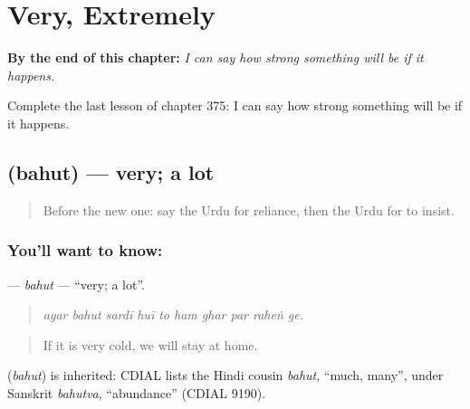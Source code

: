 
\chapter{Very, Extremely}
\label{ch:ur-very-extremely}

\begin{chapteropening}
\textbf{By the end of this chapter:} \emph{I can say how strong something will be if it happens.}

Complete the last lesson of chapter 375: I can say how strong something will be if it happens.
\end{chapteropening}

\section[\texorpdfstring{\ur{بہت} (bahut)}{بہت (bahut)}]{ (bahut) — very; a lot}

\label{lesson:UR-C375-bahut}



\begin{quote}
Before the new one: say the Urdu for reliance, then the Urdu for to insist.
\end{quote}

\subsection*{You'll want to know: }
\textbf{} — \emph{bahut} — \textquotedblleft{}very; a lot\textquotedblright{}.

\begin{quote}
         
\end{quote}

\begin{quote}
\emph{agar bahut sardī huī to ham ghar par raheṅ ge.}
\end{quote}

\begin{quote}
If it is very cold, we will stay at home.
\end{quote}

\begin{cousinweb}
\textbf{} (\emph{bahut}) is inherited: CDIAL lists the Hindi cousin \emph{bahut}, \textquotedblleft{}much, many\textquotedblright{}, under Sanskrit \emph{bahutva}, \textquotedblleft{}abundance\textquotedblright{} (CDIAL 9190).
\end{cousinweb}

